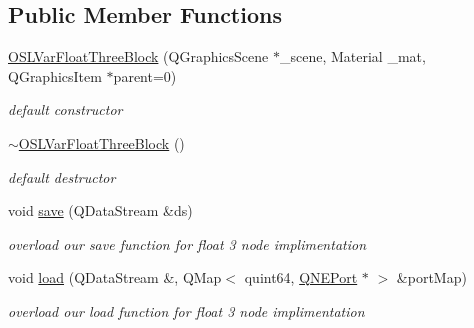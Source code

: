 \subsection*{Public Member Functions}
\begin{DoxyCompactItemize}
\item 
\hypertarget{class_o_s_l_var_float_three_block_a61b6ed21aa2cf47cc98ca128fa568972}{\hyperlink{class_o_s_l_var_float_three_block_a61b6ed21aa2cf47cc98ca128fa568972}{O\-S\-L\-Var\-Float\-Three\-Block} (Q\-Graphics\-Scene $\ast$\-\_\-scene, Material \-\_\-mat, Q\-Graphics\-Item $\ast$parent=0)}\label{class_o_s_l_var_float_three_block_a61b6ed21aa2cf47cc98ca128fa568972}

\begin{DoxyCompactList}\small\item\em default constructor \end{DoxyCompactList}\item 
\hypertarget{class_o_s_l_var_float_three_block_a0cc9b0d8b21bbfc15e9b1d7a4cad01a0}{\hyperlink{class_o_s_l_var_float_three_block_a0cc9b0d8b21bbfc15e9b1d7a4cad01a0}{$\sim$\-O\-S\-L\-Var\-Float\-Three\-Block} ()}\label{class_o_s_l_var_float_three_block_a0cc9b0d8b21bbfc15e9b1d7a4cad01a0}

\begin{DoxyCompactList}\small\item\em default destructor \end{DoxyCompactList}\item 
\hypertarget{class_o_s_l_var_float_three_block_a2da8aea901036ce306b650bb5dc9f9b7}{void \hyperlink{class_o_s_l_var_float_three_block_a2da8aea901036ce306b650bb5dc9f9b7}{save} (Q\-Data\-Stream \&ds)}\label{class_o_s_l_var_float_three_block_a2da8aea901036ce306b650bb5dc9f9b7}

\begin{DoxyCompactList}\small\item\em overload our save function for float 3 node implimentation \end{DoxyCompactList}\item 
\hypertarget{class_o_s_l_var_float_three_block_a6c310fbded12f17c05e850a42b18f1e9}{void \hyperlink{class_o_s_l_var_float_three_block_a6c310fbded12f17c05e850a42b18f1e9}{load} (Q\-Data\-Stream \&, Q\-Map$<$ quint64, \hyperlink{class_q_n_e_port}{Q\-N\-E\-Port} $\ast$ $>$ \&port\-Map)}\label{class_o_s_l_var_float_three_block_a6c310fbded12f17c05e850a42b18f1e9}

\begin{DoxyCompactList}\small\item\em overload our load function for float 3 node implimentation \end{DoxyCompactList}\end{DoxyCompactItemize}
